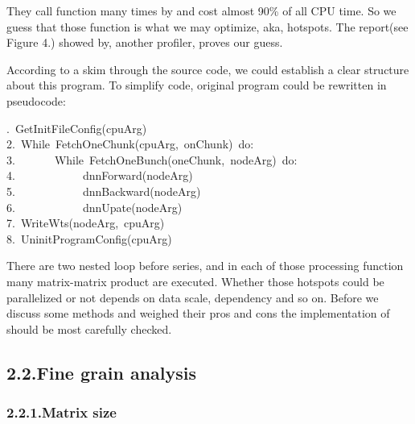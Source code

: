 \documentclass{article}
\begin{document}
\noindent{}They call  function  many times by  and 
cost almost 90\% of all CPU time. So we guess that those function
 is what we may optimize, aka, hotspots.
The report(see Figure 4.) showed by, another profiler, proves our guess.%

According to a skim through the source code, we could establish a clear structure about this program. To simplify code, original program could be rewritten in pseudocode:%
\begin{mdpre}%
.~{GetInitFileConfig}(cpuArg)\\
{2}.~{While}~{FetchOneChunk}(cpuArg,~onChunk)~{do}:\\
{3}.~~~~~~~{While}~{FetchOneBunch}(oneChunk,~nodeArg)~{do}:\\
{4}.~~~~~~~~~~~~dnnForward(nodeArg)\\
{5}.~~~~~~~~~~~~dnnBackward(nodeArg)\\
{6}.~~~~~~~~~~~~dnnUpate(nodeArg)\\
{7}.~{WriteWts}(nodeArg,~cpuArg)\\
{8}.~{UninitProgramConfig}(cpuArg)\\
\end{mdpre}\noindent{}There are two nested loop before  series, and 
in each of those processing function many matrix-matrix product are
executed. Whether those hotspots could be parallelized or not depends
on data scale, dependency and so on. Before we discuss some methods and weighed their pros and cons the implementation of  should be most carefully checked.

\subsection{2.2.\hspace*{0.5em}Fine grain analysis}\label{sec-fine-grain-analysis}%

\subsubsection{2.2.1.\hspace*{0.5em}Matrix size}\label{sec-matrix-size}%
\end{document}
